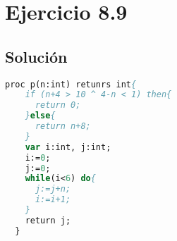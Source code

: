 \documentclass[11pt, a4paper, titlepage]{article}
\begin{document}
\section*{Ejercicio 8.9}
\subsection*{Solución}
\begin{lstlisting}[language=pascal]
  proc p(n:int) retunrs int{
    if (n+4 > 10 ^ 4-n < 1) then{
      return 0;
    }else{
      return n+8;
    }
    var i:int, j:int;
    i:=0;
    j:=0;
    while(i<6) do{
      j:=j+n;
      i:=i+1;
    }
    return j;
  }
\end{lstlisting}
\end{document}
